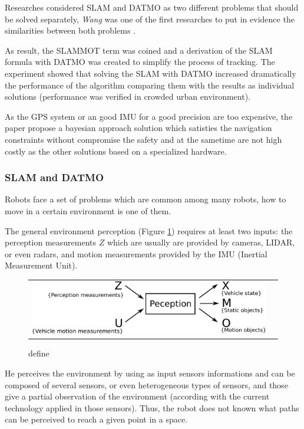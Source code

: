 \documentclass{llncs}
\begin{document}
Researches considered SLAM and DATMO as two different problems that should be solved separately, \textit{Wang} was one of the first researches to put in evidence the similarities between both problems \cite{Wang03onlinesimultaneous}.

As result, the SLAMMOT term was coined and a derivation of the SLAM formula with DATMO was created to simplify the process of tracking. The experiment showed that solving the SLAM with DATMO increased dramatically the performance of the algorithm comparing them with the results as individual solutions (performance was verified in crowded urban environment).

As the GPS system or an good IMU for a good precision are too expensive, the paper propose a bayesian approach solution which satisties the navigation constraints without compromise the safety and at the sametime are not high costly as the other solutions based on a specialized hardware.

\subsubsection{SLAM and DATMO}

Robots face a set of problems which are common among many robots, how to move in a certain environment is one of them.

The general environment perception (Figure \ref{fig:perception:cycle}) requires at least two inputs: the perception measurements $Z$ which are usually are provided by cameras, LIDAR, or even radars, and motion measurements provided by the IMU (Inertial Measurement Unit).

\begin{figure}[H]
   \centering
     \begin{tabular}{lr}
       \includegraphics[scale=0.5]{img/fig:perception:cycle}
     \end{tabular}
   \caption{define}
   \label{fig:perception:cycle}
 \end{figure}


He perceives the environment by using as input sensors informations and can be composed of several sensors, or even heterogeneous types of sensors, and those give a partial observation of the environment (according with the current technology applied in those sensors). Thus, the robot does not known what paths can be perceived to reach a given point in a space.
\end{document}
